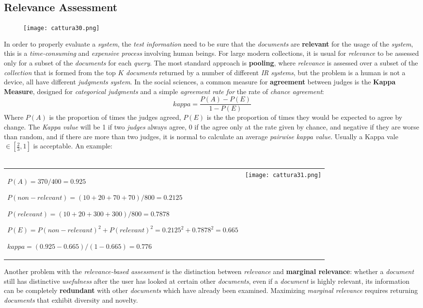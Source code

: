 \documentclass{article}
\begin{document}
\subsection{Relevance Assessment}
\begin{figure}[H]
  \centering
  \texttt{[image: cattura30.png]}
\end{figure}
In order to properly evaluate a \emph{system}, the \emph{test information} need to be sure that the \emph{documents} are \textbf{relevant} for the usage of the \emph{system}, this is a \emph{time-consuming} and \emph{expensive process }involving human beings. For large modern collections, it is usual for \emph{relevance} to be assessed only for a subset of the \emph{documents} for each \emph{query}. The most standard approach is \textbf{pooling}, where \emph{relevance} is assessed over a subset of the \emph{collection} that is formed from the top $K$ \emph{documents} returned by a number of different\emph{ IR systems}, but the problem is a human is not a device, all have different \emph{judgments system}. In the social sciences, a common measure for \textbf{agreement} between judges is the \textbf{Kappa Measure}, designed for \emph{categorical judgments} and a simple \emph{agreement rate for} the rate of \emph{chance agreement}:
\[kappa = \frac{P(A) - P(E)}{1-P(E)}\]
Where $P(A)$ is the proportion of times the judges agreed, $P(E)$ is the the proportion of times they would be expected to agree by change. The\emph{ Kappa value} will be 1 if two \emph{judges} always agree, 0 if the agree only at the rate given by chance, and negative if they are worse than random, and if there are more than two judges, it is normal to calculate an average \emph{pairwise kappa value}. Usually a Kappa vale $\in \left [ \frac{2}{3}, 1 \right ]$ is acceptable. An example:\\\\
\begin{tabular}{L{8cm} C{8cm}}{$P(A) = 370 / 400  = 0.925$
\newline
$P(non-relevant) = (10+20+70+70) / 800  = 0.2125$
\newline
$P(relevant) = (10+20+300+300) / 800  = 0.7878$
\newline
$P(E) = P(non-relevant)^2 + P(relevant)^2 = 0.2125^2 + 0.7878^2 = 0.665$
\newline
$kappa = (0.925 - 0.665)/(1-0.665) = 0.776$}&
 \texttt{[image: cattura31.png]} 
\end{tabular}
Another problem with the \emph{relevance-based assessment} is the distinction between \emph{relevance} and \textbf{marginal relevance}: whether a \emph{document} still has distinctive \emph{usefulness} after the user has looked at certain other \emph{documents}, even if a \emph{document} is highly relevant, its information can be completely \textbf{redundant} with other \emph{documents} which have already been examined. Maximizing \emph{marginal relevance} requires returning \emph{documents} that exhibit diversity and novelty.
\end{document}
